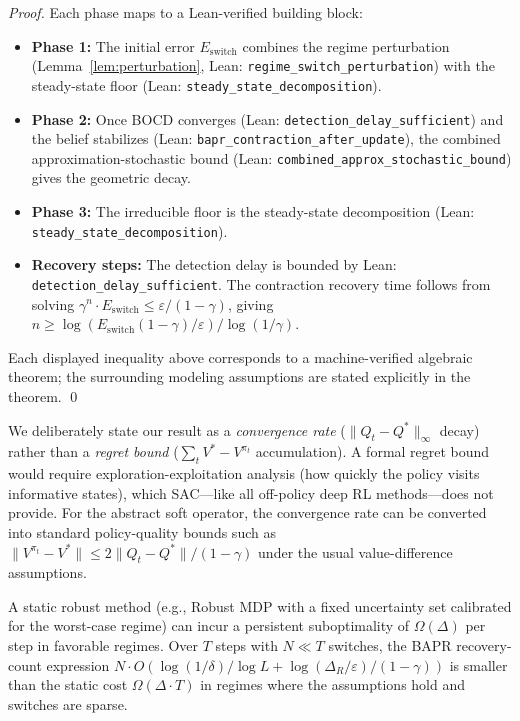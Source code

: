 \begin{proof}
Each phase maps to a Lean-verified building block:
\begin{itemize}
    \item \textbf{Phase 1:} The initial error $E_{\text{switch}}$ combines the regime perturbation (Lemma~\ref{lem:perturbation}, Lean: \texttt{regime\_switch\_perturbation}) with the steady-state floor (Lean: \texttt{steady\_state\_decomposition}).
    \item \textbf{Phase 2:} Once BOCD converges (Lean: \texttt{detection\_delay\_sufficient}) and the belief stabilizes (Lean: \texttt{bapr\_contraction\_after\_update}), the combined approximation-stochastic bound (Lean: \texttt{combined\_approx\_stochastic\_bound}) gives the geometric decay.
    \item \textbf{Phase 3:} The irreducible floor is the steady-state decomposition (Lean: \texttt{steady\_state\_decomposition}).
    \item \textbf{Recovery steps:} The detection delay is bounded by Lean: \texttt{detection\_delay\_sufficient}. The contraction recovery time follows from solving $\gamma^n \cdot E_{\text{switch}} \leq \varepsilon/(1-\gamma)$, giving $n \geq \log(E_{\text{switch}}(1-\gamma)/\varepsilon) / \log(1/\gamma)$.
\end{itemize}
Each displayed inequality above corresponds to a machine-verified algebraic theorem; the surrounding modeling assumptions are stated explicitly in the theorem. \qed
\end{proof}

\begin{remark}
    We deliberately state our result as a \emph{convergence rate} ($\|Q_t - Q^*\|_\infty$ decay) rather than a \emph{regret bound} ($\sum_t V^* - V^{\pi_t}$ accumulation). A formal regret bound would require exploration-exploitation analysis (how quickly the policy visits informative states), which SAC---like all off-policy deep RL methods---does not provide. For the abstract soft operator, the convergence rate can be converted into standard policy-quality bounds such as $\|V^{\pi_t} - V^*\| \leq 2\|Q_t - Q^*\|/(1-\gamma)$ under the usual value-difference assumptions.
\end{remark}

\begin{remark}
    A static robust method (e.g., Robust MDP with a fixed uncertainty set calibrated for the worst-case regime) can incur a persistent suboptimality of $\Omega(\Delta)$ per step in favorable regimes. Over $T$ steps with $N \ll T$ switches, the BAPR recovery-count expression $N \cdot O(\log(1/\delta)/\log L + \log(\Delta_R/\varepsilon)/(1-\gamma))$ is smaller than the static cost $\Omega(\Delta \cdot T)$ in regimes where the assumptions hold and switches are sparse.
\end{remark}


